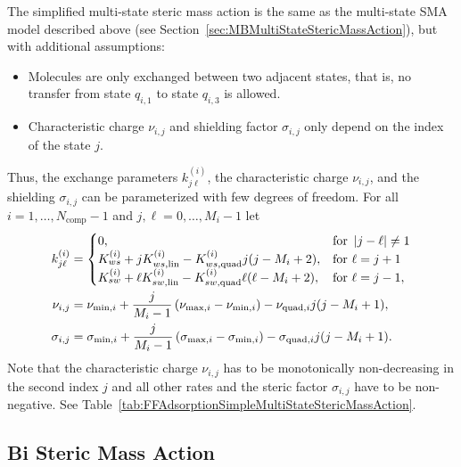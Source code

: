 The simplified multi-state steric mass action is the same as the multi-state SMA model described above (see Section~\ref{sec:MBMultiStateStericMassAction}), but with additional assumptions: 
\begin{itemize}
  \item Molecules are only exchanged between two adjacent states, that is, no transfer from state $q_{i,1}$ to state $q_{i,3}$ is allowed.
  \item Characteristic charge $\nu_{i,j}$ and shielding factor $\sigma_{i,j}$ only depend on the index of the state $j$.
\end{itemize}
Thus, the exchange parameters $k^{(i)}_{j\ell}$, the characteristic charge $\nu_{i,j}$, and the shielding $\sigma_{i,j}$ can be parameterized with few degrees of freedom.
For all $i = 1,\dots,N_{\text{comp}} - 1$ and $j,\ell = 0,\dots,M_i - 1$ let
\begin{align*}
  k^{(i)}_{j\ell} &= \begin{cases}
    0, & \text{for } \left\lvert j-\ell\right\rvert \neq 1 \\
    K^{(i)}_{ws} + j K^{(i)}_{ws,\text{lin}} - K^{(i)}_{ws,\text{quad}} j(j - M_i+2), & \text{for } \ell = j+1 \\
    K^{(i)}_{sw} + \ell K^{(i)}_{sw,\text{lin}} - K^{(i)}_{sw,\text{quad}} \ell(\ell - M_i+2), & \text{for } \ell = j-1,
  \end{cases}\\
  \nu_{i,j} &= \nu_{\text{min},i} + \frac{j}{M_i-1} \left( \nu_{\text{max},i} - \nu_{\text{min},i} \right) - \nu_{\text{quad},i} j (j-M_i+1), \\
  \sigma_{i,j} &= \sigma_{\text{min},i} + \frac{j}{M_i-1} \left( \sigma_{\text{max},i} - \sigma_{\text{min},i} \right) - \sigma_{\text{quad},i} j (j-M_i+1).
\end{align*}
Note that the characteristic charge $\nu_{i,j}$ has to be monotonically non-decreasing in the second index $j$ and all other rates and the steric factor $\sigma_{i,j}$ have to be non-negative.
See Table~\ref{tab:FFAdsorptionSimpleMultiStateStericMassAction}.

\subsection{Bi Steric Mass Action}

